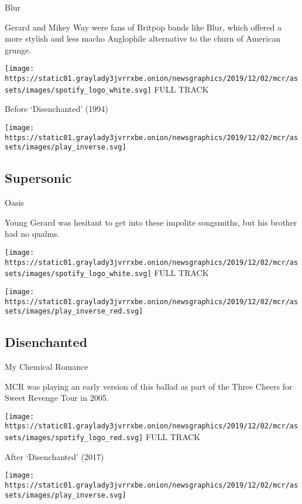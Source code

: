 Blur

Gerard and Mikey Way were fans of Britpop bands like Blur, which offered
a more stylish and less macho Anglophile alternative to the churn of
American grunge.

\href{https://open.spotify.com/track/1JVsEciUZKtji9oAC9LMz1?si=NBWu6Pd1QoupdZUZ1vT1xQ}{}

\texttt{[image: https://static01.graylady3jvrrxbe.onion/newsgraphics/2019/12/02/mcr/assets/images/spotify\_logo\_white.svg]}
FULL TRACK

Before `Disenchanted' (1994)

\texttt{[image: https://static01.graylady3jvrrxbe.onion/newsgraphics/2019/12/02/mcr/assets/images/play\_inverse.svg]}

\hypertarget{supersonic}{%
\subsection{Supersonic}\label{supersonic}}

Oasis

Young Gerard was hesitant to get into these impolite songsmiths, but his
brother had no qualms.

\href{https://open.spotify.com/track/1qr2GUENukq90wmJtbg3qr?si=bNmRg87uQh-k08vU-lkV1Q}{}

\texttt{[image: https://static01.graylady3jvrrxbe.onion/newsgraphics/2019/12/02/mcr/assets/images/spotify\_logo\_white.svg]}
FULL TRACK

\texttt{[image: https://static01.graylady3jvrrxbe.onion/newsgraphics/2019/12/02/mcr/assets/images/play\_inverse\_red.svg]}

\hypertarget{disenchanted-1}{%
\subsection{Disenchanted}\label{disenchanted-1}}

My Chemical Romance

MCR was playing an early version of this ballad as part of the Three
Cheers for Sweet Revenge Tour in 2005.

\href{https://open.spotify.com/track/6T7MAQCekVb3UnCykjX3BP?si=BvDM6CE0SX2brow5ArRw5Q}{}

\texttt{[image: https://static01.graylady3jvrrxbe.onion/newsgraphics/2019/12/02/mcr/assets/images/spotify\_logo\_red.svg]}
FULL TRACK

After `Disenchanted' (2017)

\texttt{[image: https://static01.graylady3jvrrxbe.onion/newsgraphics/2019/12/02/mcr/assets/images/play\_inverse.svg]}

